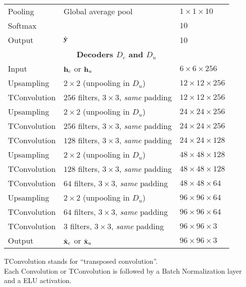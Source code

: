\documentclass[runningheads]{llncs}
\begin{document}
\begin{table}[htbp]
\begin{threeparttable}
\begin{tabular}{ l l l}
Pooling & Global average pool & $1\times1\times10$ \\
Softmax &   & $10$ \\
Output & $\hat{\mathbf{y}}$ & 10 \\
\toprule
\multicolumn{3}{c}{\textbf{Decoders $D_c$ and $D_u$}}\\
\midrule
Input & $\mathbf{h}_c$ or $\mathbf{h}_u$ & $6\times 6\times 256$ \\
Upsampling   & $2\times2$ (unpooling in $D_u$)  & $12\times 12\times 256$ \\
TConvolution & $256$ filters, $3\times3$, \textit{same} padding  & $12\times 12\times 256$ \\
Upsampling   & $2\times2$ (unpooling in $D_u$)  & $24\times 24\times 256$ \\
TConvolution & $256$ filters, $3\times3$, \textit{same} padding  & $24\times 24\times 256$ \\
TConvolution & $128$ filters, $3\times3$, \textit{same} padding  & $24\times 24\times 128$ \\
Upsampling   & $2\times2$ (unpooling in $D_u$)  & $48\times 48\times 128$ \\
TConvolution & $128$ filters, $3\times3$, \textit{same} padding  & $48\times 48\times 128$ \\
TConvolution & $64$ filters, $3\times3$, \textit{same} padding  & $48\times 48\times 64$ \\
Upsampling   & $2\times2$ (unpooling in $D_u$)  & $96\times 96\times 64$ \\
TConvolution & $64$ filters, $3\times3$, \textit{same} padding  & $96\times 96\times 64$ \\
TConvolution & $3$ filters, $3\times3$, \textit{same} padding  & $96\times 96\times 3$ \\
Output & $\hat{\mathbf{x}}_c$ or $\hat{\mathbf{x}}_u$ & $96\times 96 \times 3$ \\
\bottomrule
\end{tabular}
\begin{tablenotes}
TConvolution stands for ``transposed convolution''.\\ Each Convolution or TConvolution is followed by a Batch Normalization layer and a ELU activation.
\end{tablenotes}
\end{threeparttable}
\end{table}
\end{document}
